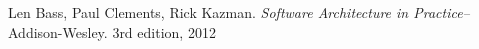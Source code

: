 












\begin{thebibliography}{9}
	Len Bass, Paul Clements, Rick Kazman.
	\emph{Software Architecture in Practice–}
	Addison-Wesley.
	3rd edition,
	2012
\end{thebibliography}
